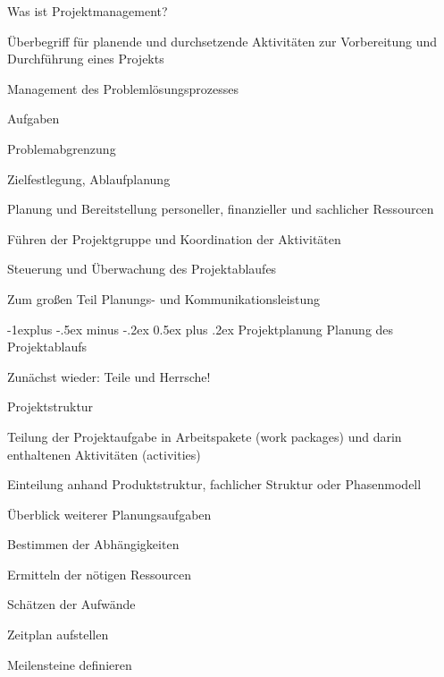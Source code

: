 \documentclass[a4paper]{article}
\makeatletter
\renewcommand{\subsection}{\@startsection{subsection}{2}{0mm}%
                                {-1explus -.5ex minus -.2ex}%
                                {0.5ex plus .2ex}%
                                {\normalfont\normalsize\bfseries}}
\makeatother
\begin{document}
\begin{multicols}{3}
  Was ist Projektmanagement?
  \begin{itemize*}
    \item Überbegriff für planende und durchsetzende Aktivitäten zur Vorbereitung und Durchführung eines Projekts
    \item Management des Problemlösungsprozesses
    \item Aufgaben
    \begin{itemize*}
      \item Problemabgrenzung
      \item Zielfestlegung, Ablaufplanung
      \item Planung und Bereitstellung personeller, finanzieller und sachlicher Ressourcen
      \item Führen der Projektgruppe und Koordination der Aktivitäten
      \item Steuerung und Überwachung des Projektablaufes
      \item Zum großen Teil Planungs- und Kommunikationsleistung
    \end{itemize*}
  \end{itemize*}

  \subsection{Projektplanung}
  Planung des Projektablaufs
  \begin{itemize*}
    \item Zunächst wieder: Teile und Herrsche!
    \item Projektstruktur
    \begin{itemize*}
      \item Teilung der Projektaufgabe in Arbeitspakete (work packages) und darin enthaltenen Aktivitäten (activities)
      \item Einteilung anhand Produktstruktur, fachlicher Struktur oder Phasenmodell
    \end{itemize*}
    \item Überblick weiterer Planungsaufgaben
    \begin{itemize*}
      \item Bestimmen der Abhängigkeiten
      \item Ermitteln der nötigen Ressourcen
      \item Schätzen der Aufwände
      \item Zeitplan aufstellen
      \item Meilensteine definieren
    \end{itemize*}
  \end{itemize*}


\end{multicols}
\end{document}
